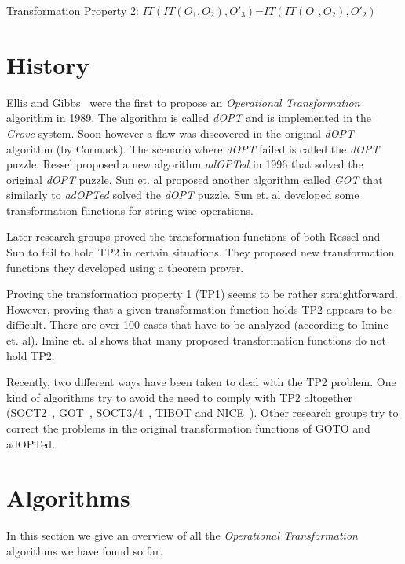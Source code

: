 \documentclass[11pt,a4paper]{article}
\begin{document}
\begin{defn}
Transformation Property 2: 
$IT(IT(O_{1},O_{2}),O'_{3})$=$IT(IT(O_{1},O_{2}),O'_{2})$
\end{defn}


\section{History}
{Ellis and Gibbs}~\cite{ellis} were the first to propose an \emph{Operational Transformation} algorithm in 1989. The algorithm is called \emph{dOPT} and is implemented in the \emph{Grove} system. Soon however a flaw was discovered in the original \emph{dOPT} algorithm (by Cormack\cite{cormack95a}). The scenario where \emph{dOPT} failed is called the \emph{dOPT} puzzle. Ressel\cite{ressel96} proposed a new algorithm \emph{adOPTed} in 1996 that solved the original \emph{dOPT} puzzle. {Sun et. al}\cite{sun98a} proposed another algorithm called \emph{GOT} that similarly to \emph{adOPTed} solved the \emph{dOPT} puzzle. {Sun et. al}\cite{sun98b} developed some transformation functions for string-wise operations.

Later research groups\cite{imine03}\cite{imine04} proved the transformation functions of both Ressel\cite{ressel96} and Sun\cite{sun98a} to fail to hold TP2 in certain situations. They proposed new transformation functions they developed using a theorem prover. 

Proving the transformation property 1 (TP1) seems to be rather straightforward. However, proving that a given transformation function holds TP2 appears to be difficult. There are over 100 cases that have to be analyzed (according to {Imine et. al}\cite{imine04}). Imine et. al shows that many proposed transformation functions do not hold TP2. 

Recently, two different ways have been taken to deal with the TP2 problem. One kind of algorithms try to avoid the need to comply with TP2 altogether (SOCT2~\cite{suleiman97}, GOT~\cite{sun98a}, SOCT3/4~\cite{suleiman00}, TIBOT\cite{tibot} and NICE~\cite{sun02}). Other research groups try to correct the problems in the original transformation functions of GOTO\cite{sun98b} and adOPTed\cite{ressel96}. 


\section{Algorithms}
In this section we give an overview of all the \emph{Operational Transformation} algorithms we have found so far.
\end{document}
